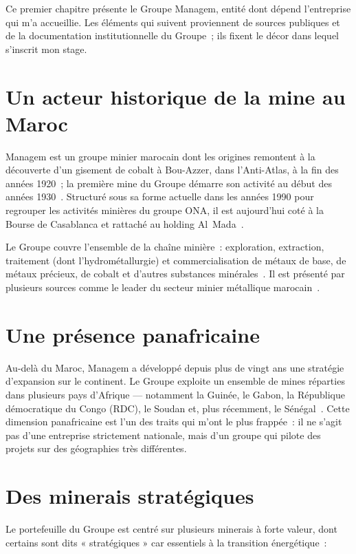 \documentclass[12pt,a4paper,oneside]{report}
\begin{document}
Ce premier chapitre présente le Groupe Managem, entité dont dépend l'entreprise qui m'a accueillie. Les éléments qui suivent proviennent de sources publiques et de la documentation institutionnelle du Groupe~; ils fixent le décor dans lequel s'inscrit mon stage.

\section{Un acteur historique de la mine au Maroc}

Managem est un groupe minier marocain dont les origines remontent à la découverte d'un gisement de cobalt à Bou-Azzer, dans l'Anti-Atlas, à la fin des années 1920~; la première mine du Groupe démarre son activité au début des années 1930~\cite{managem_wiki}. Structuré sous sa forme actuelle dans les années 1990 pour regrouper les activités minières du groupe ONA, il est aujourd'hui coté à la Bourse de Casablanca et rattaché au holding Al~Mada~\cite{managem_wiki}.

Le Groupe couvre l'ensemble de la chaîne minière~: exploration, extraction, traitement (dont l'hydrométallurgie) et commercialisation de métaux de base, de métaux précieux, de cobalt et d'autres substances minérales~\cite{managem_wiki}. Il est présenté par plusieurs sources comme le leader du secteur minier métallique marocain~\cite{afd_potentiel}.

\section{Une présence panafricaine}

Au-delà du Maroc, Managem a développé depuis plus de vingt ans une stratégie d'expansion sur le continent. Le Groupe exploite un ensemble de mines réparties dans plusieurs pays d'Afrique --- notamment la Guinée, le Gabon, la République démocratique du Congo (RDC), le Soudan et, plus récemment, le Sénégal~\cite{afd_potentiel,ecofin_managem}. Cette dimension panafricaine est l'un des traits qui m'ont le plus frappée~: il ne s'agit pas d'une entreprise strictement nationale, mais d'un groupe qui pilote des projets sur des géographies très différentes.

\section{Des minerais stratégiques}

Le portefeuille du Groupe est centré sur plusieurs minerais à forte valeur, dont certains sont dits « stratégiques » car essentiels à la transition énergétique~:
\end{document}
